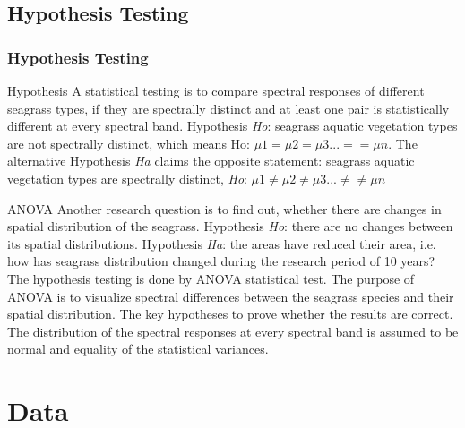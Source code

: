 \documentclass[pdflatex,compress]{beamer}
\begin{document}
\subsection{Hypothesis Testing}
\begin{frame}\frametitle{Hypothesis Testing}
\begin{alertblock}{Hypothesis}
\scriptsize{A statistical testing is to compare spectral responses of different seagrass types, if they are spectrally distinct and at least one pair is statistically different at every spectral band. Hypothesis \emph{Ho}: seagrass aquatic vegetation types are not spectrally distinct, which means Ho: $\mu 1 = \mu 2 = \mu 3 ... = = \mu n$. The alternative Hypothesis \emph{Ha} claims the opposite statement: seagrass aquatic vegetation types are spectrally distinct, \emph{Ho}: $\mu 1 \neq \mu 2 \neq \mu 3 ... \neq \neq \mu n$}
\end{alertblock}

\begin{block}{ANOVA}
\scriptsize{Another research question is to find out, whether there are changes in spatial distribution of the seagrass.  Hypothesis \emph{Ho}: there are no changes between its spatial distributions. Hypothesis \emph{Ha}: the areas have reduced their area, i.e. how has seagrass distribution changed during the research period of 10 years? The hypothesis testing is done by ANOVA statistical test. The purpose of ANOVA is to visualize spectral differences between the seagrass species and their spatial distribution. The key hypotheses to prove whether the results are correct. The distribution of the spectral responses at every spectral band is assumed to be normal and equality of the statistical variances.}
\end{block}

\end{frame}

\section{Data}
\end{document}
